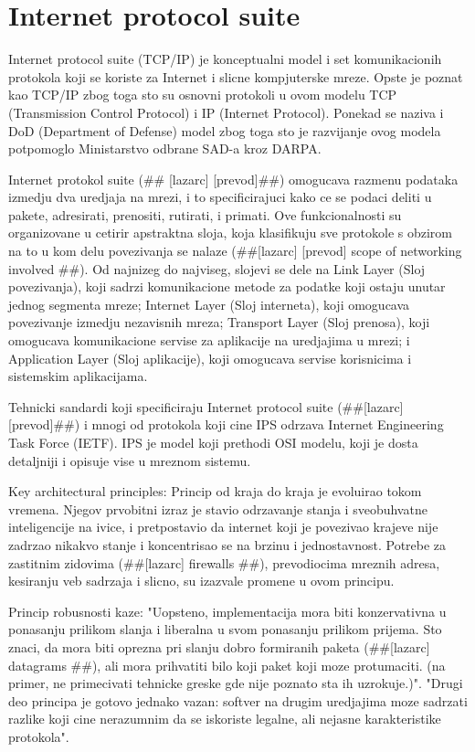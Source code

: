 \documentclass[a4paper,12pt, master]{etf}
\begin{document}
	\section{Internet protocol suite}
	
	Internet protocol suite (TCP/IP) je konceptualni model i set komunikacionih protokola koji se 
	koriste za Internet i slicne kompjuterske mreze. Opste je poznat kao TCP/IP zbog toga sto 
	su osnovni protokoli u ovom modelu TCP (Transmission Control Protocol) i IP (Internet 
	Protocol). Ponekad se naziva i DoD (Department of Defense) model zbog toga sto je 
	razvijanje ovog modela potpomoglo Ministarstvo odbrane SAD-a kroz DARPA.

	Internet protokol suite (\#\# [lazarc] [prevod]\#\#) omogucava razmenu podataka izmedju dva
	uredjaja na mrezi, i to specificirajuci kako ce se podaci deliti u pakete, adresirati,
	prenositi, rutirati, i primati. Ove funkcionalnosti su organizovane u cetirir apstraktna 
	sloja, koja klasifikuju sve protokole s obzirom na to u kom delu povezivanja se nalaze 
	(\#\#[lazarc] [prevod] scope of networking involved \#\#). Od najnizeg do najviseg, 
	slojevi se dele na Link	Layer (Sloj povezivanja), koji sadrzi komunikacione metode za 
	podatke koji ostaju unutar jednog segmenta mreze; Internet Layer (Sloj interneta), koji 
	omogucava povezivanje izmedju nezavisnih mreza; Transport Layer (Sloj prenosa), koji 
	omogucava komunikacione servise za aplikacije na uredjajima u mrezi; i Application Layer 
	(Sloj aplikacije), koji omogucava servise korisnicima i	sistemskim aplikacijama.

	Tehnicki sandardi koji specificiraju Internet protocol suite (\#\#[lazarc] [prevod]\#\#) i 
	mnogi od protokola koji cine IPS odrzava Internet Engineering Task Force (IETF). IPS je 
	model koji prethodi OSI modelu, koji je dosta detaljniji i opisuje vise u mreznom sistemu.

	Key architectural principles:
	Princip od kraja do kraja je evoluirao tokom vremena. Njegov prvobitni izraz je stavio 
	odrzavanje stanja i sveobuhvatne inteligencije na ivice, i pretpostavio da internet koji je 
	povezivao krajeve nije zadrzao nikakvo stanje i koncentrisao se na brzinu i jednostavnost. 
	Potrebe za zastitnim zidovima (\#\#[lazarc] firewalls \#\#), prevodiocima mreznih adresa, 
	kesiranju veb sadrzaja i slicno, su izazvale promene u ovom principu.

	Princip robusnosti kaze: "Uopsteno, implementacija mora biti konzervativna u ponasanju 
	prilikom slanja i liberalna u svom ponasanju prilikom prijema. Sto znaci, da mora biti 
	oprezna pri slanju dobro formiranih paketa (\#\#[lazarc] datagrams \#\#), ali mora 
	prihvatiti bilo koji paket koji moze protumaciti. (na primer, ne primecivati tehnicke greske 
	gde nije poznato sta ih uzrokuje.)". "Drugi deo principa je gotovo jednako vazan: softver na 
	drugim uredjajima moze sadrzati razlike koji cine nerazumnim da se iskoriste legalne, ali 
	nejasne karakteristike protokola".
\end{document}
